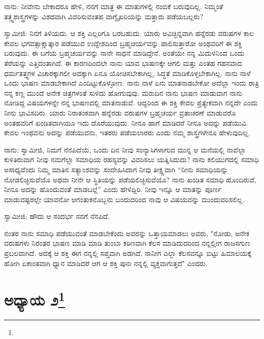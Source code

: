 ನಾನು: ನೀವೇನು ಬೇಕಾದರೂ ಹೇಳಿ, ನನಗೆ ಮಾತ್ರ ಈ ಮಾತುಗಳಲ್ಲಿ ನಂಬಿಕೆ ಬರುವುದಿಲ್ಲ. ನಿಮ್ಮಂತೆ ತತ್ತ್ವಶಾಸ್ತ್ರಗಳನ್ನು ವಿಶದವಾಗಿ ವಿವರಿಸುವಂತಹ ವಾಗ್ವೈಖರಿಯನ್ನು ಮತ್ತಾರು ಪಡೆಯಬಲ್ಲರು?

ಸ್ವಾಮೀಜಿ: ನಿನಗೆ ತಿಳಿಯದು. ಆ ಶಕ್ತಿ ಎಲ್ಲರಿಗೂ ಬರಬಹುದು. ಯಾರು ಅವಿಚ್ಛಿನ್ನವಾಗಿ ಹನ್ನೆರಡು ವರುಷಗಳ ಕಾಲ ಕೇವಲ ಭಗವತ್ಸಾಕ್ಷಾತ್ಕಾರ ಪಡೆಯುವ ಉದ್ದೇಶದಿಂದ ಬ್ರಹ್ಮಚರ್ಯವನ್ನು ಪಾಲಿಸುತ್ತಾರೋ ಅಂಥವರಿಗೆ ಈ ಶಕ್ತಿ ಬರುವುದು. ಈ ಬಗೆಯ ಬ್ರಹ್ಮಚರ್ಯವನ್ನು ನಾನೇ ಸಾಧನೆ ಮಾಡಿದ್ದೇನೆ. ಅಂತೆಯೇ ನನ್ನ ಮಿದುಳಿನಿಂದ ಒಂದು ತೆರೆಯನ್ನು ಎತ್ತಿದಂತಾಗಿದೆ. ಈ ಕಾರಣದಿಂದಲೇ ನಾನು ಯಾವ ಭಾಷಣಕ್ಕೇ ಆಗಲಿ ಮತ್ತು ಎಂತಹ ಗಹನವಾದ ಧರ್ಮತತ್ತ್ವಗಳ ವಿಚಾರಕ್ಕಾಗಲೀ ಅದಕ್ಕಾಗಿ ಏನೂ ಯೋಚಿಸಬೇಕಾಗಿಲ್ಲ, ಸಿದ್ಧತೆ ಮಾಡಿಕೊಳ್ಳಬೇಕಾಗಿಲ್ಲ. ನಾನು ನಾಳೆ ಒಂದು ಭಾಷಣ ಮಾಡಬೇಕಾಗಿದೆ ಎಂದಿಟ್ಟುಕೊಳ್ಳೋಣ. ನಾನು ನಾಳೆ ಏನು ಮಾತನಾಡಬೇಕೋ ಅದೆಲ್ಲಾ ಇಂದು ರಾತ್ರಿ ನನ್ನ ಕಣ್ಣ ಮುಂದೆ ಅನೇಕ ಚಿತ್ರಗಳಂತೆ ಸುಳಿದು ಹೋಗುವುವು. ಮರುದಿನ ನಾನು ಭಾಷಣ ಮಾಡುವಾಗ ನಾನು ನೋಡಿದ್ದ ವಿಷಯಗಳನ್ನೇ ನನ್ನ ಭಾಷಣದಲ್ಲಿ ಮಾತನಾಡುವೆ. ಆದ್ದರಿಂದ ಈ ಶಕ್ತಿ ಕೇವಲ ಪ್ರತ್ಯೇಕವಾಗಿ ನನ್ನದೇ ಎಂದು ನೀನು ಭಾವಿಸದಿರು. ಯಾರು ನಿರಾತಂಕವಾಗಿ ಹನ್ನೆರಡು ವರುಷಗಳ ಬ್ರಹ್ಮಚರ್ಯ ವ್ರತಾಚರಣೆ ಮಾಡುವರೊ ಅಂತಹವರಿಗೆ ಖಂಡಿತವಾಗಿಯೂ ಇದು ದೊರೆಯುವುದು. ನೀನೂ ಹಾಗೆ ಮಾಡಿದರೆ ನೀನೂ ಅದನ್ನು ಪಡೆಯುವಿ. ಕೇವಲ ಇಂಥವನು ಅದನ್ನು ಪಡೆಯುವನು, ಇತರರು ಪಡೆಯಲಾರರು ಎಂದು ನಮ್ಮ ಶಾಸ್ತ್ರಗಳೇನೂ ಹೇಳುವುದಿಲ್ಲ.

ನಾನು: ಸ್ವಾಮೀಜಿ, ನಿಮಗೆ ನೆನಪಿದೆಯೆ, ಒಂದು ದಿನ ನೀವು ಸಂನ್ಯಾಸಿಗಳಾಗುವ ಮುನ್ನ ಆ ಮನೆಯಲ್ಲಿ ನಾವೆಲ್ಲಾ ಕುಳಿತಿರುವಾಗ ನೀವು ನಮಗೆಲ್ಲಾ ಸಮಾಧಿಯ ರಹಸ್ಯವನ್ನು ವಿವರಿಸಲು ಯತ್ನಿಸಿದುದು? ನಾನು ಕಲಿಯುಗದಲ್ಲಿ ಸಮಾಧಿ ಅಸಾಧ್ಯವೆಂದು ನಿಮ್ಮ ಮಾತಿನ ಸತ್ಯಾಂಶವನ್ನು ಸಂದೇಹಿಸಿದಾಗ ನೀವು ತೀಕ್ಷ್ಣವಾಗಿ “ನೀನು ಸಮಾಧಿಯನ್ನು ನೋಡಲಿಚ್ಛಿಸುವೆಯೊ ಅಥವಾ ನೀನೇ ಆ ಸ್ಥಿತಿಯನ್ನು ಪಡೆಯಲಿಚ್ಛಿಸುವೆಯೊ? ನಾನು ಖಂಡಿತ ಸಮಾಧಿ ಹೊಂದಿರುವೆ, ನೀನೂ ಅದನ್ನು ಹೊಂದುವಂತೆ ಮಾಡಬಲ್ಲೆ” ಎಂದು ಹೇಳಿದ್ದಿರಿ. ನೀವು ಇನ್ನೂ ಆ ಮಾತನ್ನು ಪೂರ್ಣ ಮಾಡುವಷ್ಟರಲ್ಲೇ ಯಾವನೋ ಆಗಂತುಕನೊಬ್ಬನು ಬಂದುದರಿಂದ ನಾವು ಆ ವಿಷಯವನ್ನು ಮುಂದುವರಿಸಲಿಲ್ಲ.

ಸ್ವಾಮೀಜಿ: ಹೌದು ಆ ಸಂದರ್ಭ ನನಗೆ ನೆನಪಿದೆ.

ನಂತರ ನಾನು ಸಮಾಧಿ ಪಡೆಯುವಂತೆ ಮಾಡಬೇಕೆಂದು ಅವರನ್ನು ಒತ್ತಾಯಮಾಡಲು ಅವರು, "ನೋಡು, ಅನೇಕ ವರುಷಗಳು ನಿರಂತರ ಭಾಷಣ ಮಾಡಿ ಮಾಡಿ ತುಂಬಾ ಕಠಿಣವಾಗಿ ಕೆಲಸ ಮಾಡಿದುದರಿಂದ ನನ್ನಲ್ಲೀಗ ರಾಜಸಗುಣ ಪ್ರಬಲವಾಗಿದೆ. ಅದಕ್ಕೆ ಆ ಶಕ್ತಿ ಈಗ ನನ್ನಲ್ಲಿ ಸಪ್ತವಾಗಿ ಅಡಗಿದೆ. ನಾನೀಗ ಎಲ್ಲಾ ಕೆಲಸವನ್ನೂ ಬಿಟ್ಟು ಹಿಮಾಲಯಕ್ಕೆ ಹೋಗಿ ಏಕಾಂತವಾಗಿ ಧ್ಯಾನ ಮಾಡಿದರೆ ಆಗ ಆ ಶಕ್ತಿ ಪುನಃ ನನ್ನಲ್ಲಿ ವ್ಯಕ್ತವಾಗುತ್ತದೆ" ಎಂದರು.

\newpage

\chapter[ಅಧ್ಯಾಯ ೨]{ಅಧ್ಯಾಯ ೨\protect\footnote{}}

